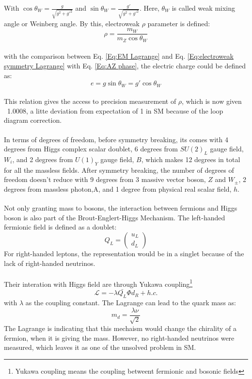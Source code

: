 With $\cos{\theta_W}=\frac{g}{\sqrt{g^2+g'^2}}$ and $\sin{\theta_W}=\frac{g'}{\sqrt{g^2+g'^2}}$. Here, $\theta_W$ is called weak mixing angle or Weinberg angle. By this, electroweak $\rho$ parameter is defined:
\begin{equation}
\label{Eq:rho}
\rho = \frac{m_W}{m_Z\cos{\theta_W}} 
\end{equation}
\\with the comparison between Eq. \ref{Eq:EM Lagrange} and Eq. \ref{Eq:electroweak symmetry Lagrange} with Eq. \ref{Eq:AZ phase}, the electric charge could be defined as:
\begin{equation}
e=g\sin{\theta_W}=g'\cos{\theta_W}
\end{equation}
\\This relation gives the access to precision measurement of $\rho$, which is now given ~1.0008, a litte deviation from expectation of 1 in SM because of the loop diagram correction.
\\
\\In terms of degrees of freedom, before symmetry breaking, its comes with 4 degrees from Higgs complex scalar doublet, 6 degrees from $SU(2)_L$ gauge field, $W_i$, and 2 degrees from $U(1)_Y$ gauge field, $B$, which makes 12 degrees in total for all the massless fields. After symmetry breaking, the number of degrees of freedom doesn't reduce with 9 degrees from 3 massive vector boson, $Z$ and $W_{\pm}$, 2 degrees from massless photon,A, and 1 degree from physical real scalar field, $h$.
\\
\\Not only granting mass to bosons, the interaction between fermions and Higgs boson is also part of the Brout-Englert-Higgs Mechanism. The left-handed fermionic field is defined as a doublet:
\begin{equation}
 Q_L=\left(  \begin{array}{ c } u_L\\  d_L \end{array} \right)
\end{equation}
For right-handed leptons, the representation would be in a singlet because of the lack of right-handed neutrinos.      
\\
\\Their interation with Higgs field are through Yukawa coupling\footnote{Yukawa coupling means the coupling betweent fermionic and bosonic fields}
\begin{equation}
\mathcal{L} = -\lambda\bar{Q_L}\Phi d_R + h.c. 
\end{equation}
with $\lambda$ as the coupling constant. The Lagrange can lead to the quark mass as:
\begin{equation}
 m_d=\frac{\lambda \nu}{\sqrt{2}}
\end{equation}
The Lagrange is indicating that this mechaism would change the chirality of a fermion, when it is giving the mass. However, no right-handed neutrinos were measured, which leaves it as one of the unsolved problem in SM. 
